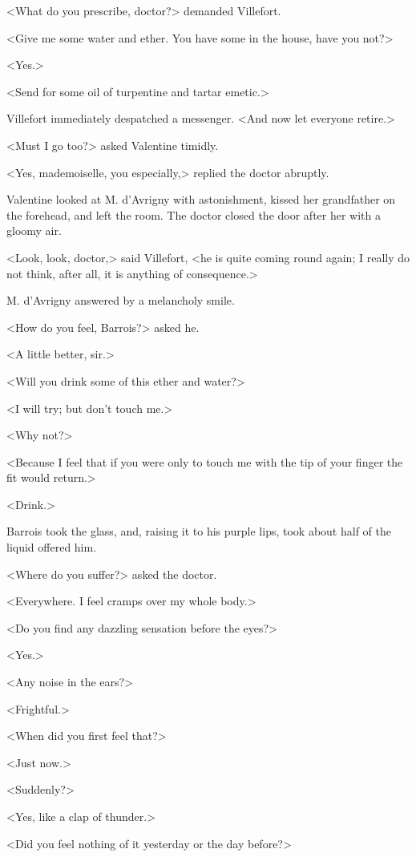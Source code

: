  <What do you prescribe, doctor?> demanded Villefort. 

 <Give me some water and ether. You have some in the house, have you not?> 

 <Yes.> 

 <Send for some oil of turpentine and tartar emetic.> 

 Villefort immediately despatched a messenger. <And now let everyone retire.> 

 <Must I go too?> asked Valentine timidly. 

 <Yes, mademoiselle, you especially,> replied the doctor abruptly. 

 Valentine looked at M. d'Avrigny with astonishment, kissed her grandfather on the forehead, and left the room. The doctor closed the door after her with a gloomy air. 

 <Look, look, doctor,> said Villefort, <he is quite coming round again; I really do not think, after all, it is anything of consequence.> 

 M. d'Avrigny answered by a melancholy smile. 

 <How do you feel, Barrois?> asked he. 

 <A little better, sir.> 

 <Will you drink some of this ether and water?> 

 <I will try; but don't touch me.> 

 <Why not?> 

 <Because I feel that if you were only to touch me with the tip of your finger the fit would return.> 

 <Drink.> 

 Barrois took the glass, and, raising it to his purple lips, took about half of the liquid offered him. 

 <Where do you suffer?> asked the doctor. 

 <Everywhere. I feel cramps over my whole body.> 

 <Do you find any dazzling sensation before the eyes?> 

 <Yes.> 

 <Any noise in the ears?> 

 <Frightful.>

<When did you first feel that?> 

 <Just now.> 

 <Suddenly?> 

 <Yes, like a clap of thunder.> 

 <Did you feel nothing of it yesterday or the day before?> 

